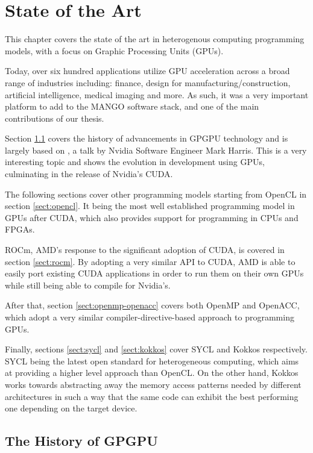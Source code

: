\chapter{State of the Art} \label{ch:StateOfTheArt}

This chapter covers the state of the art in heterogenous computing programming models, with a focus on Graphic Processing Units (GPUs). 

Today, over six hundred applications utilize GPU acceleration across a broad range of industries including: finance, design for manufacturing/construction, artificial intelligence, medical imaging and more. As such, it was a very important platform to add to the MANGO software stack, and one of the main contributions of our thesis.

Section \ref{sect:history-gpgpu} covers the history of advancements in GPGPU technology and is largely based on \cite{brief_history_gpgpu}, a talk by Nvidia Software Engineer Mark Harris. This is a very interesting topic and shows the evolution in development using GPUs, culminating in the release of Nvidia's CUDA. 

The following sections cover other programming models starting from OpenCL in section \ref{sect:opencl}. It being the most well established programming model in GPUs after CUDA, which also provides support for programming in CPUs and FPGAs.

ROCm, AMD's response to the significant adoption of CUDA, is covered in section \ref{sect:rocm}. By adopting a very similar API to CUDA, AMD is able to easily port existing CUDA applications in order to run them on their own GPUs while still being able to compile for Nvidia's.

After that, section \ref{sect:openmp-openacc} covers both OpenMP and OpenACC, which adopt a very similar compiler-directive-based approach to programming GPUs.

Finally, sections \ref{sect:sycl} and \ref{sect:kokkos} cover SYCL and Kokkos respectively. SYCL being the latest open standard for heterogeneous computing, which aims at providing a higher level approach than OpenCL. On the other hand, Kokkos works towards abstracting away the memory access patterns needed by different architectures in such a way that the same code can exhibit the best performing one depending on the target device.

\section{The History of GPGPU} \label{sect:history-gpgpu}

